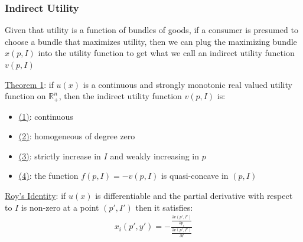 \documentclass{article}
\begin{document}
\subsubsection{Indirect Utility}
Given that utility is a function of bundles of goods, if a consumer is presumed to choose a bundle that maximizes utility, then we can plug the maximizing bundle $x(p,I)$ into the utility function to get what we call an indirect utility function $v(p,I)$ \par \vspace{0.3em}
  \underline{Theorem 1}: if $u(x)$ is a continuous and strongly monotonic real valued utility function on $\mathbb{R}_{+}^{n}$, then the indirect utility function $v(p, I)$ is:
  \begin{itemize}
    \item  \underline{(1)}: continuous
    \item  \underline{(2)}: homogeneous of degree zero
    \item  \underline{(3)}: strictly increase in $I$ and weakly increasing in $p$
    \item  \underline{(4)}: the function $f(p, I) = -v(p,I)$ is quasi-concave in $(p,I)$
  \end{itemize}
  \par
  \underline{Roy's Identity}: if $u(x)$ is differentiable and the partial derivative with respect to $I$ is non-zero at a point $(p', I')$ then it satisfies:
  \begin{gather*}
    x_{i}(p', y') = -\frac{\tfrac{\partial v(p',I')}{\partial p_{i}}}{\tfrac{\partial v(p',I')}{\partial I}}
  \end{gather*}
  \par
\vspace{6mm}
\end{document}
